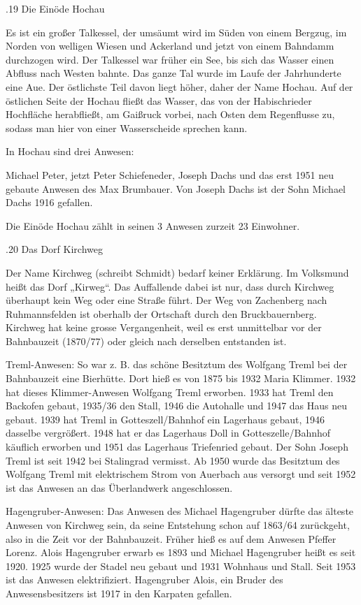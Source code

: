 \documentclass{book}
\begin{document}
.19 Die Einöde Hochau

Es ist ein großer Talkessel, der umsäumt wird im Süden von einem Bergzug, im
Norden von welligen Wiesen und Ackerland und jetzt von einem Bahndamm durchzogen
wird. Der Talkessel war früher ein See, bis sich das Wasser einen Abfluss nach
Westen bahnte. Das ganze Tal wurde im Laufe der Jahrhunderte eine Aue. Der
östlichste Teil davon liegt höher, daher der Name Hochau. Auf der östlichen
Seite der Hochau fließt das Wasser, das von der Habischrieder Hochfläche
herabfließt, am Gaißruck vorbei, nach Osten dem Regenflusse zu, sodass man hier
von einer Wasserscheide sprechen kann.

In Hochau sind drei Anwesen:

Michael Peter, jetzt Peter Schiefeneder, Joseph Dachs und das erst 1951 neu
gebaute Anwesen des Max Brumbauer. Von Joseph Dachs ist der Sohn Michael Dachs
1916 gefallen.

Die Einöde Hochau zählt in seinen 3 Anwesen zurzeit 23 Einwohner.

.20 Das Dorf Kirchweg

Der Name Kirchweg (schreibt Schmidt) bedarf keiner Erklärung. Im Volksmund heißt
das Dorf „Kirweg“. Das Auffallende dabei ist nur, dass durch Kirchweg überhaupt
kein Weg oder eine Straße führt. Der Weg von Zachenberg nach Ruhmannsfelden ist
oberhalb der Ortschaft durch den Bruckbauernberg. Kirchweg hat keine grosse
Vergangenheit, weil es erst unmittelbar vor der Bahnbauzeit (1870/77) oder
gleich nach derselben entstanden ist.

Treml-Anwesen: So war z. B. das schöne Besitztum des Wolfgang Treml bei der
Bahnbauzeit eine Bierhütte. Dort hieß es von 1875 bis 1932 Maria Klimmer. 1932
hat dieses Klimmer-Anwesen Wolfgang Treml erworben. 1933 hat Treml den Backofen
gebaut, 1935/36 den Stall, 1946 die Autohalle und 1947 das Haus neu gebaut. 1939
hat Treml in Gotteszell/Bahnhof ein Lagerhaus gebaut, 1946 dasselbe vergrößert.
1948 hat er das Lagerhaus Doll in Gotteszelle/Bahnhof käuflich erworben und 1951
das Lagerhaus Triefenried gebaut. Der Sohn Joseph Treml ist seit 1942 bei
Stalingrad vermisst. Ab 1950 wurde das Besitztum des Wolfgang Treml mit
elektrischem Strom von Auerbach aus versorgt und seit 1952 ist das Anwesen an
das Überlandwerk angeschlossen.

Hagengruber-Anwesen: Das Anwesen des Michael Hagengruber dürfte das älteste
Anwesen von Kirchweg sein, da seine Entstehung schon auf 1863/64 zurückgeht,
also in die Zeit vor der Bahnbauzeit. Früher hieß es auf dem Anwesen Pfeffer
Lorenz. Alois Hagengruber erwarb es 1893 und Michael Hagengruber heißt es seit
1920. 1925 wurde der Stadel neu gebaut und 1931 Wohnhaus und Stall. Seit 1953
ist das Anwesen elektrifiziert. Hagengruber Alois, ein Bruder des
Anwesensbesitzers ist 1917 in den Karpaten gefallen.
\end{document}
